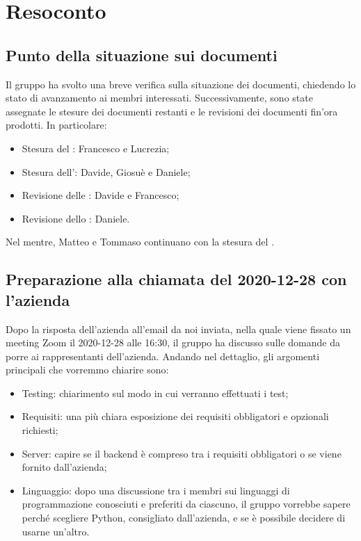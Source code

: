 \section{Resoconto}

\subsection{Punto della situazione sui documenti}

Il gruppo \gruppo{} ha svolto una breve verifica sulla situazione dei documenti, chiedendo lo stato di avanzamento ai membri interessati. Successivamente, sono state assegnate le stesure dei documenti restanti e le revisioni dei documenti fin'ora prodotti. In particolare:
\begin{itemize}
\item Stesura del \PdQ{}: Francesco e Lucrezia;
\item Stesura dell'\AdR{}: Davide, Giosuè e Daniele;
\item Revisione delle \NdP{}: Davide e Francesco;
\item Revisione dello \SdF{}: Daniele.
\end{itemize}
Nel mentre, Matteo e Tommaso continuano con la stesura del \PdP{}.


\subsection{Preparazione alla chiamata del 2020-12-28 con l'azienda}

Dopo la risposta dell'azienda all'email da noi inviata, nella quale viene fissato un meeting Zoom il 2020-12-28 alle 16:30, il gruppo ha discusso sulle domande da porre ai rappresentanti dell'azienda. Andando nel dettaglio, gli argomenti principali che vorremmo chiarire sono:
\begin{itemize}

\item Testing: chiarimento sul modo in cui verranno effettuati i test;

\item Requisiti: una più chiara esposizione dei requisiti obbligatori e opzionali richiesti;

\item Server: capire se il backend è compreso tra i requisiti obbligatori o se viene fornito dall'azienda;

\item Linguaggio: dopo una discussione tra i membri sui linguaggi di programmazione conosciuti e preferiti da ciascuno, il gruppo vorrebbe sapere perché scegliere Python, consigliato dall'azienda, e se è possibile decidere di usarne un'altro.

\end{itemize}



